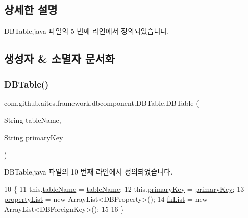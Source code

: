 \subsection{상세한 설명}


D\+B\+Table.\+java 파일의 5 번째 라인에서 정의되었습니다.



\subsection{생성자 \& 소멸자 문서화}
\mbox{\label{classcom_1_1github_1_1aites_1_1framework_1_1dbcomponent_1_1_d_b_table_a91138e17585ce7ca7009e5525a9f201b}} 
\subsubsection{\texorpdfstring{D\+B\+Table()}{DBTable()}}
{\footnotesize\ttfamily com.\+github.\+aites.\+framework.\+dbcomponent.\+D\+B\+Table.\+D\+B\+Table (\begin{DoxyParamCaption}\item[{String}]{table\+Name,  }\item[{String}]{primary\+Key }\end{DoxyParamCaption})}



D\+B\+Table.\+java 파일의 10 번째 라인에서 정의되었습니다.


\begin{DoxyCode}
10                                                        \{
11         this.\mbox{\hyperlink{classcom_1_1github_1_1aites_1_1framework_1_1dbcomponent_1_1_d_b_table_a13baee6ab61eeea3b604d2a7b99b11e7}{tableName}} = \mbox{\hyperlink{classcom_1_1github_1_1aites_1_1framework_1_1dbcomponent_1_1_d_b_table_a13baee6ab61eeea3b604d2a7b99b11e7}{tableName}};
12         this.\mbox{\hyperlink{classcom_1_1github_1_1aites_1_1framework_1_1dbcomponent_1_1_d_b_table_a2a972d26ced2f37c2e83625617951e2a}{primaryKey}} = \mbox{\hyperlink{classcom_1_1github_1_1aites_1_1framework_1_1dbcomponent_1_1_d_b_table_a2a972d26ced2f37c2e83625617951e2a}{primaryKey}};
13         \mbox{\hyperlink{classcom_1_1github_1_1aites_1_1framework_1_1dbcomponent_1_1_d_b_table_aaa1e58925c9f05a3cdc868defed1e0de}{propertyList}} = \textcolor{keyword}{new} ArrayList<DBProperty>();
14         \mbox{\hyperlink{classcom_1_1github_1_1aites_1_1framework_1_1dbcomponent_1_1_d_b_table_ae3a224a5b6fc20939a74e36127103bcc}{fkList}} = \textcolor{keyword}{new} ArrayList<DBForeignKey>();
15         
16     \}
\end{DoxyCode}


